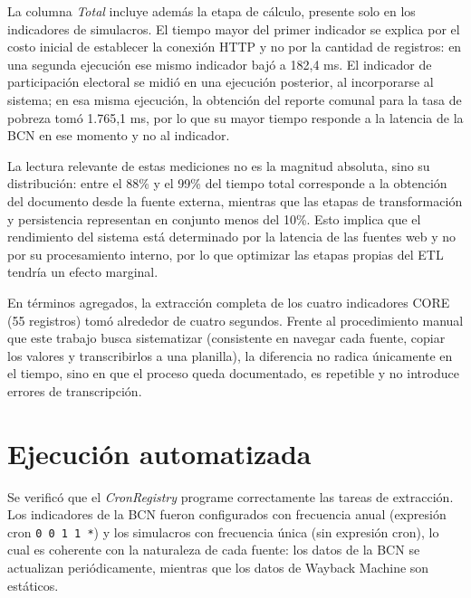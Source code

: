 \documentclass[12pt,letterpaper,oneside]{report}
\begin{document}
La columna \textit{Total} incluye adem\'as la etapa de c\'alculo, presente solo en los indicadores de simulacros. El tiempo mayor del primer indicador se explica por el costo inicial de establecer la conexi\'on HTTP y no por la cantidad de registros: en una segunda ejecuci\'on ese mismo indicador baj\'o a 182,4 ms. El indicador de participaci\'on electoral se midi\'o en una ejecuci\'on posterior, al incorporarse al sistema; en esa misma ejecuci\'on, la obtenci\'on del reporte comunal para la tasa de pobreza tom\'o 1.765,1 ms, por lo que su mayor tiempo responde a la latencia de la BCN en ese momento y no al indicador.

La lectura relevante de estas mediciones no es la magnitud absoluta, sino su distribuci\'on: entre el 88\% y el 99\% del tiempo total corresponde a la obtenci\'on del documento desde la fuente externa, mientras que las etapas de transformaci\'on y persistencia representan en conjunto menos del 10\%. Esto implica que el rendimiento del sistema est\'a determinado por la latencia de las fuentes web y no por su procesamiento interno, por lo que optimizar las etapas propias del ETL tendr\'ia un efecto marginal.

En t\'erminos agregados, la extracci\'on completa de los cuatro indicadores CORE (55 registros) tom\'o alrededor de cuatro segundos. Frente al procedimiento manual que este trabajo busca sistematizar (consistente en navegar cada fuente, copiar los valores y transcribirlos a una planilla), la diferencia no radica \'unicamente en el tiempo, sino en que el proceso queda documentado, es repetible y no introduce errores de transcripci\'on.

\section{Ejecuci\'on automatizada}
\label{sec:ejecucion-automatizada}

Se verific\'o que el \textit{CronRegistry} programe correctamente las tareas de extracci\'on. Los indicadores de la BCN fueron configurados con frecuencia anual (expresi\'on cron \texttt{0 0 1 1 *}) y los simulacros con frecuencia \'unica (sin expresi\'on cron), lo cual es coherente con la naturaleza de cada fuente: los datos de la BCN se actualizan peri\'odicamente, mientras que los datos de Wayback Machine son est\'aticos.


\end{document}
